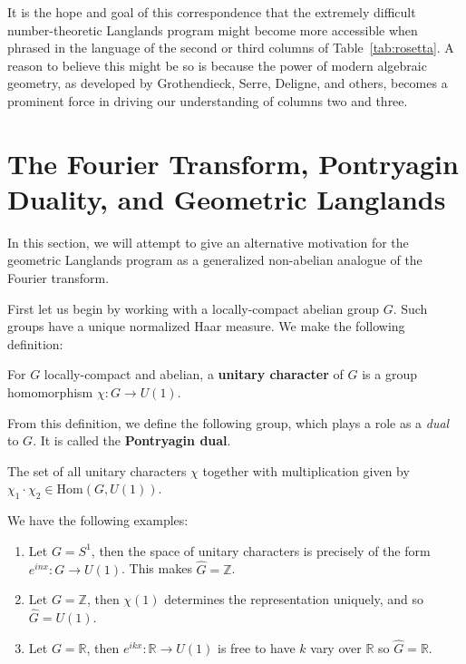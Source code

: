 It is the hope and goal of this correspondence that the extremely difficult number-theoretic Langlands program might become more accessible when phrased in the language of the second or third columns of Table~\ref{tab:rosetta}. A reason to believe this might be so is because the power of modern algebraic geometry, as developed by Grothendieck, Serre, Deligne, and others, becomes a prominent force in driving our understanding of columns two and three. 



\section{The Fourier Transform, Pontryagin Duality, and Geometric Langlands} %
\label{sec:the_fourier_transform_pontryagin_duality_and_geometric_langlands}
		
In this section, we will attempt to give an alternative motivation for the geometric Langlands program as a generalized non-abelian analogue of the Fourier transform. 

First let us begin by working with a locally-compact abelian group $G$. Such groups have a unique normalized Haar measure. We make the following definition:
\begin{defn}
	For $G$ locally-compact and abelian, a \textbf{unitary character} of $G$ is a group homomorphism $\chi: G \to U(1)$.
\end{defn}
From this definition, we define the following group, which plays a role as a \emph{dual} to $G$. It is called the \textbf{Pontryagin dual}.
\begin{defn}
	The set of all unitary characters $\chi$ together with multiplication given by $\chi_1 \cdot \chi_2 \in \mathrm{Hom}(G, U(1))$.
\end{defn}

\begin{eg}
	We have the following examples:
	\begin{enumerate}
		\item Let $G = S^1$, then the space of unitary characters is precisely of the form $e^{inx}: G \to U(1)$. This makes $\widehat G = \mathbb Z$.
		\item Let $G = \mathbb Z$, then $\chi(1)$ determines the representation uniquely, and so $\widehat G = U(1)$.
		\item 			Let $G = \mathbb R$, then $e^{ikx} : \mathbb R \to U(1)$ is free to have $k$ vary over $\mathbb R$ so $\widehat G = \mathbb R$.
	\end{enumerate}

\end{eg}

